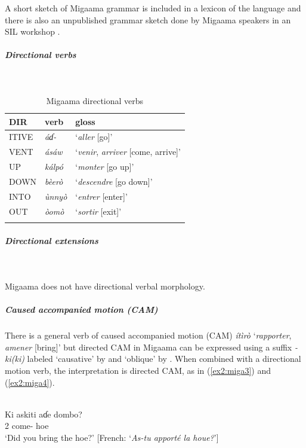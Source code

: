 A short sketch of Migaama grammar is included in a lexicon of the language \citep{jungraithmayrLexiqueMigamaMigamafrancais1992} and there is also an unpublished grammar sketch done by Migaama speakers in an SIL workshop \citep{moussaDTLNovembre2010n.d.}.

\newpage
\subparagraph{Directional verbs}~

\begin{table}[H]
	\caption{Migaama directional verbs} 
	\label{tab:migaV}
	\begin{tabular}{lll} %
		\lsptoprule
		DIR & verb & gloss   \\ %
		\midrule
		ITIVE & \textit{áɗ-} & `\textit{aller} [go]' \\
		VENT & \textit{ásáw} & `\textit{venir}, \textit{arriver} [come, arrive]' \\
		UP & \textit{kálpó} & `\textit{monter} [go up]' \\
		DOWN & \textit{bèerò} & `\textit{descendre} [go down]' \\
		INTO& \textit{ùnnyò} & `\textit{entrer} [enter]' \\
		OUT & \textit{òomò} & `\textit{sortir} [exit]' \\
		\lspbottomrule
	\end{tabular}
\end{table}

\subparagraph{Directional extensions}~

Migaama does not have directional verbal morphology. 

\subparagraph{Caused accompanied motion (CAM)}

There is a general verb of caused accompanied motion (CAM) \textit{ítìrò} `\textit{rapporter}, \textit{amener} [bring]' but directed CAM in Migaama can be expressed using a suffix \textit{-ki(ki)} labeled `causative' by \citet{ramatMorphologieVerbeMigaama2003} and `oblique' by \citet{robertsObliquesMawa2016}. When combined with a directional motion verb, the interpretation is directed CAM, as in (\ref{ex2:miga3}) and (\ref{ex2:miga4}).

\ea\label{ex2:miga3}
 \\
\gll  Ki askiti aɗe dombo? \\
2 come-  hoe \\
\glt `Did you bring the hoe?' [French: `\textit{As-tu apporté la houe?}']

